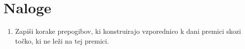 \section{Naloge}

\begin{enumerate}
    \item Zapiši korake prepogibov, ki konstruirajo vzporednico k dani premici skozi točko, ki ne leži na tej premici.
\end{enumerate}